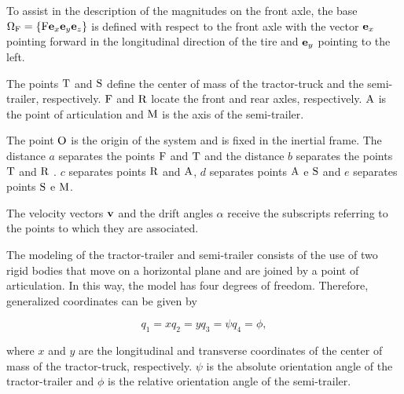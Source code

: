\documentclass[sublist,a4paper,twoside,11pt]{article}
\begin{document}
To assist in the description of the magnitudes on the front axle, the base \( \Omega_{\rm F} = \{ {\rm F} {\bf e}_x {\bf e}_y {\bf e}_z \}\)  is defined with respect to the front axle with the vector  \({\bf e}_x\) pointing forward in the longitudinal direction of the tire and \({\bf e}_y\) pointing to the left.

The points  \({\rm T}\) and \({\rm S}\)  define the center of mass of the tractor-truck and the semi-trailer, respectively. \({\rm F}\) and \({\rm R}\) locate the front and rear axles, respectively. \({\rm A}\)  is the point of articulation and \({\rm M}\) is the axis of the semi-trailer.

The point \({\rm O}\) is the origin of the system and is fixed in the inertial frame. The distance \(a\) separates the points \({\rm F}\) and \({\rm T}\)  and the distance  \(b\) separates the points \({\rm T}\) and \({\rm R}\) .  \(c\) separates points \({\rm R}\) and \({\rm A}\), \(d\) separates points \({\rm A}\) e \({\rm S}\) and  \(e\) separates points \({\rm S}\) e \({\rm M}\). 


The velocity vectors  \({\bf v}\)  and the drift angles \(\alpha\) receive the subscripts referring to the points to which they are associated.
	
The modeling of the tractor-trailer and semi-trailer consists of the use of two rigid bodies that move on a horizontal plane and are joined by a point of articulation. In this way, the model has four degrees of freedom. Therefore, generalized coordinates can be given by

\begin{subequations}
\begin{equation}
    q_1 = x
\end{equation}
\begin{equation}
    q_2 = y
\end{equation}
\begin{equation}
    q_3 = \psi
\end{equation}
\begin{equation}
    q_4 = \phi,
\end{equation}
\end{subequations}

where \(x \) and \(y \) are the longitudinal and transverse coordinates of the center of mass of the tractor-truck, respectively. \(\psi \) is the absolute orientation angle of the tractor-trailer and \(\phi \) is the relative orientation angle of the semi-trailer.
\end{document}
